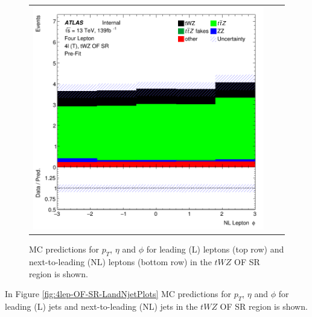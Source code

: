 \begin{figure}[htbp]
\begin{tabular}{ccc}
    \includegraphics[width=.3\textwidth]{figures/PreFitPlots/lep4_tWZ_4T_OF_NL_lepton_phi.png} \\

  \end{tabular}
    \caption{MC predictions for $p_{T}$, $\eta$ and $\phi$ for leading (L) leptons (top row) and next-to-leading (NL) leptons (bottom row) in the $tWZ$ OF SR region  is shown.}
  \label{fig:4lep-OF-SR-leptonPlots}
\end{figure}

In Figure \ref{fig:4lep-OF-SR-LandNjetPlots} MC predictions for $p_{T}$, $\eta$ and $\phi$ for leading (L) jets and next-to-leading (NL) jets in the $tWZ$ OF SR region is shown.

